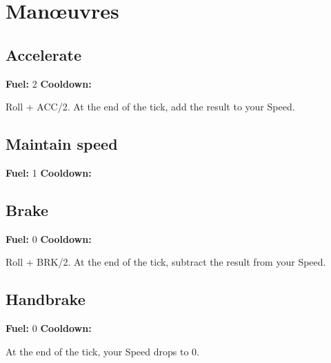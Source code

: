\documentclass[10pt, a4paper, twocolumn]{article}
\begin{document}
\section{Man\oe{}uvres}
\newcommand{\manoeuvre}[4]{
\subsection{#1}
\textbf{Fuel:} #2 \hspace{2ex} \textbf{Cooldown:} \duration{#3}

#4
}

\manoeuvre{Accelerate}{2}{1}{Roll  + ACC/2. At the end of the tick, add the result to your Speed.} \manoeuvre{Maintain speed}{1}{1}{}

\manoeuvre{Brake}{0}{2}{Roll  + BRK/2. At the end of the tick, subtract the result from your Speed.}

\manoeuvre{Handbrake}{0}{8}{At the end of the tick, your Speed drops to 0.}
\end{document}

